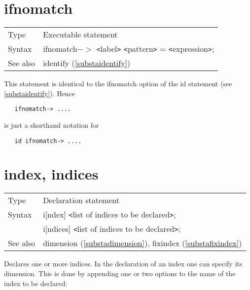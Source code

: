 
\section{ifnomatch}
\label{substaifnomatch}

\noindent \begin{tabular}{ll}
Type & Executable statement\\
Syntax & ifnomatch$-\!\!>$ {\tt<}label{\tt>} {\tt<}pattern{\tt>} = {\tt<}expression{\tt>};
\\ See also & identify (\ref{substaidentify})
\end{tabular} \vspace{4mm}

\noindent This statement is identical to the ifnomatch option 
of the id statement (see \ref{substaidentify}). Hence
\begin{verbatim}
   ifnomatch-> ....
\end{verbatim}
is just a shorthand notation for
\begin{verbatim}
   id ifnomatch-> ....
\end{verbatim}
\vspace{10mm}

 
\section{index, indices}
\label{substaindex}

\noindent \begin{tabular}{ll}
Type & Declaration statement\\
Syntax & i[ndex] {\tt<}list of indices to be declared{\tt>}; \\
       & i[ndices] {\tt<}list of indices to be declared{\tt>};
\\ See also & dimension (\ref{substadimension}),
              fixindex (\ref{substafixindex})
\end{tabular} \vspace{4mm}

\noindent Declares one or more indices. In the 
declaration of an index one can specify its dimension. 
This is done by appending one or two options to the name of the index to be 
declared:\vspace{4mm}


